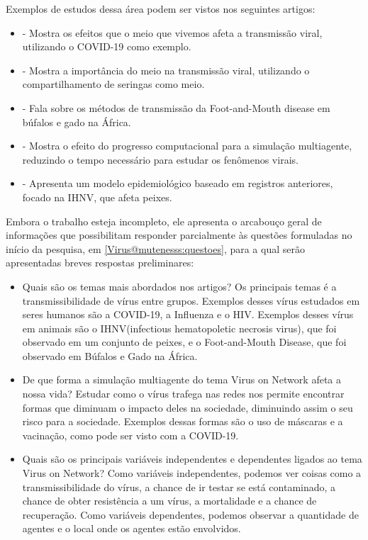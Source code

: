 Exemplos de estudos dessa área podem ser vistos nos seguintes artigos:
\begin{itemize}
    \item \cite{manout_assessing_2021} - Mostra os efeitos que o meio que vivemos afeta a transmissão viral, utilizando o COVID-19 como exemplo.
    \item \cite{noauthor_complex_nodate} - Mostra a importância do meio na transmissão viral, utilizando o compartilhamento de seringas como meio.
    \item \cite{dion_landscape_2011} - Fala sobre os métodos de transmissão da Foot-and-Mouth disease em búfalos e gado na África.
    \item \cite{fain_gpu_2022} - Mostra o efeito do progresso computacional para a simulação multiagente, reduzindo o tempo necessário para estudar os fenômenos virais.
    \item \cite{ferguson_epidemiological_2018} - Apresenta um modelo epidemiológico baseado em registros anteriores, focado na IHNV, que afeta peixes.
\end{itemize}


Embora o trabalho esteja incompleto, ele apresenta o arcabouço geral de informações que possibilitam responder parcialmente às  questões formuladas no início da pesquisa, em \ref{Virus@mutenesss:questoes}, para a qual serão apresentadas breves respostas preliminares:

\begin{itemize}
    \item Quais são os temas mais abordados nos artigos?
    \subitem Os principais temas é a transmissibilidade de vírus entre grupos. Exemplos desses vírus estudados em seres humanos são a COVID-19, a Influenza e o HIV. Exemplos desses vírus em animais são o IHNV(infectious hematopoletic necrosis virus), que foi observado em um conjunto de peixes, e o Foot-and-Mouth Disease, que foi observado em Búfalos e Gado na África.
    \item De que forma a simulação multiagente do tema Virus on Network afeta a nossa vida?
    \subitem Estudar como o vírus trafega nas redes nos permite encontrar formas que diminuam o impacto deles na sociedade, diminuindo assim o seu risco para a sociedade. Exemplos dessas formas são o uso de máscaras e a vacinação, como pode ser visto com a COVID-19.
    \item Quais são os principais variáveis independentes e dependentes ligados ao tema Virus on Network?
    \subitem Como variáveis independentes, podemos ver coisas como a transmissibilidade do vírus, a chance de ir testar se está contaminado, a chance de obter resistência a um vírus, a mortalidade e a chance de recuperação.
    Como variáveis dependentes, podemos observar a quantidade de agentes e o local onde os agentes estão envolvidos.
\end{itemize}
